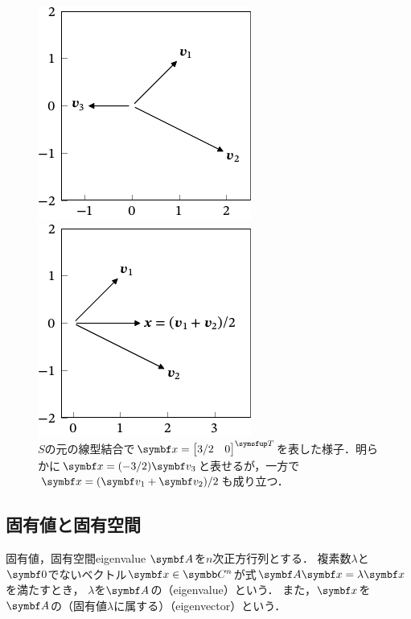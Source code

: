 \documentclass[../../main]{subfiles}
\begin{document}
\begin{figure}[htbp]
  \centering
  \begin{minipage}{0.5\linewidth}
    \centering
    \includegraphics{linear_comb1.pdf}
  \end{minipage}%
  \begin{minipage}{0.5\linewidth}
    \centering
    \includegraphics{linear_comb2.pdf}    
  \end{minipage}
  \caption{\(S\)の元の線型結合で\(\vect{x}=\trps{\begin{bmatrix}3/2 & 0\end{bmatrix}}\)を表した様子．明らかに\(\vect{x}=(-3/2)\vect{v}_3\)と表せるが，一方で\(\vect{x}=(\vect{v}_1+\vect{v}_2)/2\)も成り立つ．}
\end{figure}

\subsection{固有値と固有空間}
\begin{definition}{固有値，固有空間}{eigenvalue}
\(\mat{A}\)を\(n\)次正方行列とする．
複素数\(\lambda\)と\(\zvec\)でないベクトル\(\vect{x}\in\numset{C}^n\)が式\(\mat{A}\vect{x}=\lambda\vect{x}\)を満たすとき，
\(\lambda\)を\(\mat{A}\)の（eigenvalue）という．
また，\(\vect{x}\)を\(\mat{A}\)の（固有値\(\lambda\)に属する）（eigenvector）という．
\end{definition}
\end{document}
